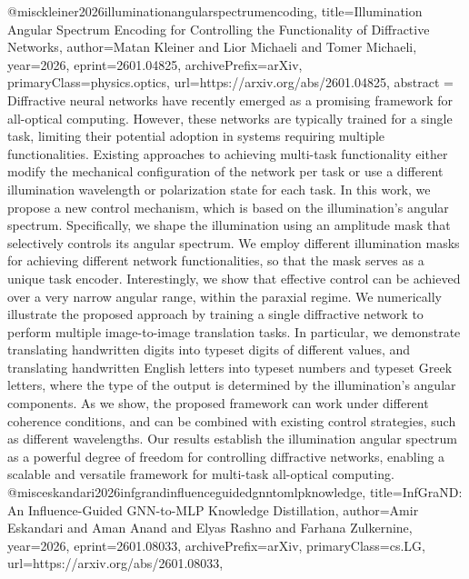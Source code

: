{}@misc{kleiner2026illuminationangularspectrumencoding,
      title={Illumination Angular Spectrum Encoding for Controlling the Functionality of Diffractive Networks}, 
      author={Matan Kleiner and Lior Michaeli and Tomer Michaeli},
      year={2026},
      eprint={2601.04825},
      archivePrefix={arXiv},
      primaryClass={physics.optics},
      url={https://arxiv.org/abs/2601.04825},
      abstract = {Diffractive neural networks have recently emerged as a promising framework for all-optical computing. However, these networks are typically trained for a single task, limiting their potential adoption in systems requiring multiple functionalities. Existing approaches to achieving multi-task functionality either modify the mechanical configuration of the network per task or use a different illumination wavelength or polarization state for each task. In this work, we propose a new control mechanism, which is based on the illumination's angular spectrum. Specifically, we shape the illumination using an amplitude mask that selectively controls its angular spectrum. We employ different illumination masks for achieving different network functionalities, so that the mask serves as a unique task encoder. Interestingly, we show that effective control can be achieved over a very narrow angular range, within the paraxial regime. We numerically illustrate the proposed approach by training a single diffractive network to perform multiple image-to-image translation tasks. In particular, we demonstrate translating handwritten digits into typeset digits of different values, and translating handwritten English letters into typeset numbers and typeset Greek letters, where the type of the output is determined by the illumination's angular components. As we show, the proposed framework can work under different coherence conditions, and can be combined with existing control strategies, such as different wavelengths. Our results establish the illumination angular spectrum as a powerful degree of freedom for controlling diffractive networks, enabling a scalable and versatile framework for multi-task all-optical computing.}
}@misc{eskandari2026infgrandinfluenceguidedgnntomlpknowledge,
      title={InfGraND: An Influence-Guided GNN-to-MLP Knowledge Distillation}, 
      author={Amir Eskandari and Aman Anand and Elyas Rashno and Farhana Zulkernine},
      year={2026},
      eprint={2601.08033},
      archivePrefix={arXiv},
      primaryClass={cs.LG},
      url={https://arxiv.org/abs/2601.08033},
}
